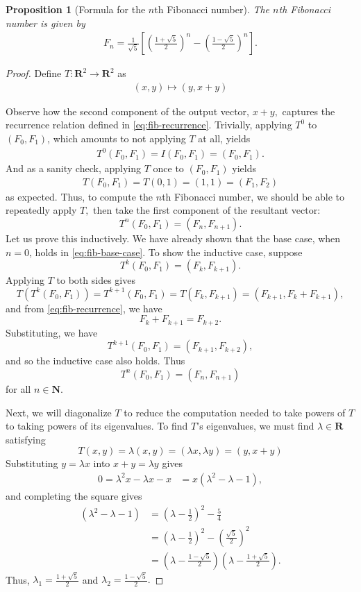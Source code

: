 \documentclass{article}
\numberwithin{equation}{section}
\newtheorem{proposition}[equation]{Proposition}
\begin{document}
\begin{proposition}[Formula for the $n$th Fibonacci number]
The $n$th Fibonacci number is given by
\begin{align}
\label{lem:fib-formula}
    F_n = \frac{1}{\sqrt{5}}\left[\left(\frac{1+\sqrt{5}}{2}\right)^{n} -\left(\frac{1-\sqrt{5}}{2}\right)^{n}\right].
\end{align}
\end{proposition}
\begin{proof}
Define $T: \mathbf{R}^2 \to \mathbf{R}^2$ as
\begin{align*}
    (x,y) \mapsto (y,x+y)
\end{align*}

Observe how the second component of the output vector, $x+y,$ captures the recurrence relation defined in \ref{eq:fib-recurrence}. Trivially, applying $T^0$ to $(F_0, F_1)$, which amounts to not applying $T$ at all, yields
\begin{align}
\label{eq:fib-base-case}
T^0(F_0,F_1)=I(F_0,F_1)=(F_0,F_1).
\end{align}
And as a sanity check, applying $T$ once to $(F_0,F_1)$  yields
\begin{align}
\label{eq:fib-n}
    T(F_0,F_1)=T(0,1)=(1,1)=(F_1,F_2)
\end{align}
as expected.
Thus, to compute the $n$th Fibonacci number, we should be able to repeatedly apply $T,$ then take the first component of the resultant vector:
$$T^n(F_0,F_1)=(F_n,F_{n+1}).$$
Let us prove this inductively. We have already shown that the base case, when $n=0$, holds in \ref{eq:fib-base-case}. To show the inductive case, suppose
$$T^k(F_0,F_1)=(F_k,F_{k+1}).$$
Applying $T$ to both sides gives
$$T(T^k(F_0,F_1))=T^{k+1}(F_0,F_1)=T(F_k,F_{k+1})=(F_{k+1},F_k+F_{k+1}),$$
and from \ref{eq:fib-recurrence}, we have
$$F_k+F_{k+1}=F_{k+2}.$$
Substituting, we have
$$T^{k+1}(F_0,F_1)=(F_{k+1},F_{k+2}), $$ and so the inductive case also holds. Thus
$$T^n(F_0,F_1)=(F_n,F_{n+1})$$
for all $n \in \mathbf{N}.$

Next, we will diagonalize $T$ to reduce the computation needed to take powers of $T$ to taking powers of its eigenvalues. To find $T$'s eigenvalues, we must find $\lambda\in\mathbf{R}$ satisfying
$$T(x,y)=\lambda (x,y)=(\lambda x,\lambda y)=(y,x+y)$$
Substituting $y=\lambda x$ into $x + y = 
\lambda y$ gives
\begin{align*}
    0 = \lambda^2x - \lambda x - x &= x(\lambda^2-\lambda - 1),
\end{align*}
and completing the square gives
\begin{align*}
    (\lambda^2-\lambda - 1) &= (\lambda - \frac{1}{2})^2 -\frac{5}{4} \\
    &= (\lambda - \frac{1}{2})^2 -(\frac{\sqrt{5}}{2})^2 \\
    &= (\lambda - \frac{1-\sqrt{5}}{2})(\lambda - \frac{1+\sqrt{5}}{2}).
\end{align*}
Thus, $\lambda_1=\frac{1+\sqrt{5}}{2}$ and $\lambda_2=\frac{1-\sqrt{5}}{2}.$


\end{proof}
\end{document}
